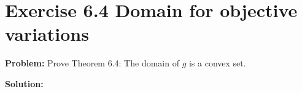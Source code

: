 \section{Exercise 6.4 Domain for objective variations}
\textbf{Problem:} Prove Theorem 6.4: The domain of $g$ is a convex set.

\textbf{Solution:} 